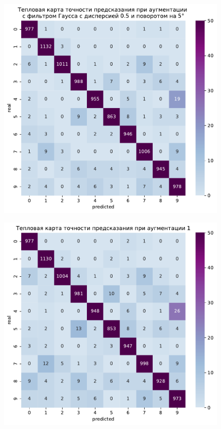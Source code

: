 \documentclass{article}
\begin{document}
\newpage
\begin{figure}[h]
	\subfigure
	{
		\begin{minipage}{8cm}
			\centering
			\includegraphics[scale=0.35]{TASK1 warm map 0.pdf}
		\end{minipage}
		\label{app:violet0}
	}
	\subfigure
	{
		\begin{minipage}{8cm}
			\centering
			\includegraphics[scale=0.35]{TASK1 warm map 1.pdf}

\end{minipage}}
\end{figure}
\end{document}
